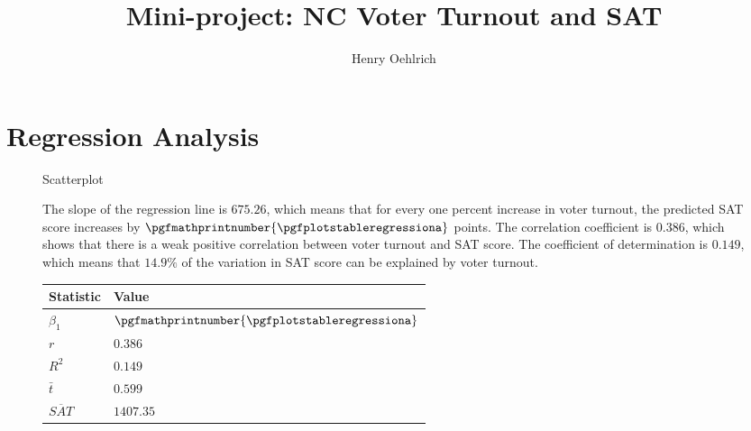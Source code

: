 \documentclass{article}
\title{Mini-project: NC Voter Turnout and SAT}
\author{Henry Oehlrich}
\begin{document}
\maketitle

\section{Regression Analysis}

\begin{figure}[h]
    \centering
    \caption{Scatterplot}
    \label{fig:scatter}
\end{figure}

\begin{figure}[h]
    \begin{minipage}{0.7\textwidth}
        The slope of the regression line is $675.26$, which means that for
        every one percent increase in voter turnout, the predicted SAT score
        increases by $\pgfmathprintnumber{\pgfplotstableregressiona}$ points.
        The correlation coefficient is $0.386$, which shows that there is a
        weak positive correlation between voter turnout and SAT score. The
        coefficient of determination is $0.149$, which means that $14.9\%$ of
        the variation in SAT score can be explained by voter turnout.
    \end{minipage}%
    \hspace{0.05\textwidth}
    \begin{minipage}{0.2\textwidth}
        \centering
        \begin{tabular}{l|l}
            \toprule
            Statistic & Value \\
            \midrule
            $\beta_1$ & $\pgfmathprintnumber{\pgfplotstableregressiona}$ \\
            $r$ & $0.386$ \\
            $R^2$ & $0.149$ \\
            $\bar{t}$ & $0.599$ \\
            $\overline{SAT}$ & $1407.35$ \\
            \bottomrule
        \end{tabular}
    \end{minipage}
\end{figure}
\end{document}
